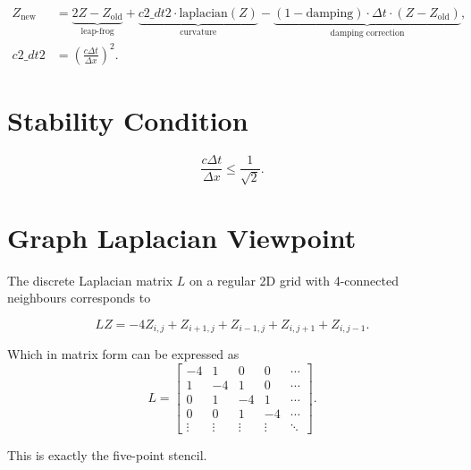 \documentclass{article}
\begin{document}
\begin{equation}
\begin{aligned}
Z_{\text{new}}
&= \underbrace{2 Z - Z_{\text{old}}}_{\text{leap-frog}}
+ \underbrace{c2\_dt2 \cdot \text{laplacian}(Z)}_{\text{curvature}}
- \underbrace{(1 - \text{damping}) \cdot \Delta t \cdot (Z - Z_{\text{old}})}_{\text{damping correction}}, \\
c2\_dt2 &= \left(\frac{c \Delta t}{\Delta x}\right)^2.
\end{aligned}
\end{equation}

\section*{Stability Condition}

\begin{equation}
\frac{c \Delta t}{\Delta x} \le \frac{1}{\sqrt{2}}.
\end{equation}

\section*{Graph Laplacian Viewpoint}

The discrete Laplacian matrix \(L\) on a regular 2D grid with 4-connected neighbours corresponds to

\begin{equation}
L Z = -4Z_{i,j} + Z_{i+1,j} + Z_{i-1,j} + Z_{i,j+1} + Z_{i,j-1}.
\end{equation}

Which in matrix form can be expressed as
\begin{equation}
    L = \begin{bmatrix}
        -4 & 1 & 0 & 0 & \cdots \\
        1 & -4 & 1 & 0 & \cdots \\
        0 & 1 & -4 & 1 & \cdots \\
        0 & 0 & 1 & -4 & \cdots \\
        \vdots & \vdots & \vdots & \vdots & \ddots
    \end{bmatrix}.
\end{equation}

This is exactly the five-point stencil.
\end{document}
